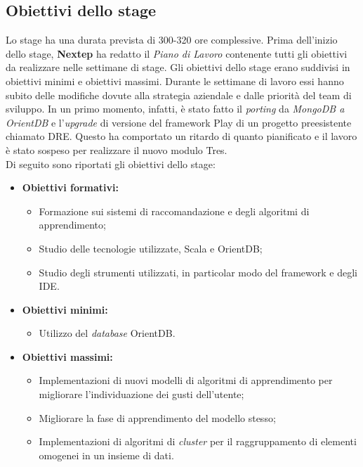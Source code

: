 \newpage
\subsection{Obiettivi dello stage}
Lo stage ha una durata prevista di 300-320 ore complessive. Prima dell'inizio dello stage, \textbf{Nextep }ha redatto il \textit{Piano di Lavoro }contenente tutti gli obiettivi da realizzare nelle settimane di stage.
Gli obiettivi dello stage erano suddivisi in obiettivi minimi e obiettivi massimi. Durante le settimane  di lavoro essi hanno subito delle modifiche dovute alla strategia aziendale e dalle priorità del team di sviluppo. In un primo momento, infatti, è stato fatto il \textit{porting }da \textit{MongoDB a OrientDB }e l'\textit{upgrade }di versione del \gls{framework} Play di un progetto preesistente chiamato DRE. Questo ha comportato un ritardo di quanto pianificato e il lavoro è stato sospeso per realizzare il nuovo modulo Tres.\\
Di seguito sono riportati gli obiettivi dello stage:
\begin{itemize}
	\item \textbf{Obiettivi formativi:}
	\begin{itemize}
		\item Formazione sui sistemi di raccomandazione e degli algoritmi di apprendimento;
		\item Studio delle tecnologie utilizzate, Scala e OrientDB;
		\item Studio degli strumenti utilizzati, in particolar modo del \gls{framework} e degli \gls{IDE}.
	\end{itemize}
	\item \textbf{Obiettivi minimi:}
	\begin{itemize}
		\item Utilizzo del \textit{database} OrientDB.
	\end{itemize}
	\item \textbf{Obiettivi massimi:}
	\begin{itemize}
		\item Implementazioni di nuovi modelli di algoritmi di apprendimento per migliorare l'individuazione dei gusti dell'utente;
		\item Migliorare la fase di apprendimento del modello stesso;
		\item Implementazioni di algoritmi di \textit{cluster }per il raggruppamento di elementi omogenei in un insieme di dati.
	\end{itemize}
\end{itemize}


